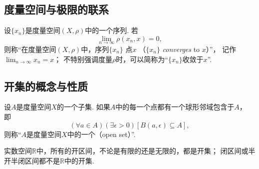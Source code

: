 \subsection{度量空间与极限的联系}
\begin{definition}
设\(\{x_n\}\)是度量空间\((X,\rho)\)中的一个序列.
若\begin{equation*}
	\lim_{n\to\infty} \rho(x_n,x) = 0,
\end{equation*}
则称“在度量空间\((X,\rho)\)中，序列\(\{x_n\}\)  点\(x\)%
（\(\{x_n\}\) \emph{converges} to \(x\)）”，
记作\(\lim_{n\to\infty} x_n = x\)；
不特别强调度量\(\rho\)时，可以简称为“\(\{x_n\}\)收敛于\(x\)”.
\end{definition}

\subsection{开集的概念与性质}
\begin{definition}\label{definition:度量空间.开集的概念}
设\(A\)是度量空间\(X\)的一个子集.
如果\(A\)中的每一个点都有一个球形邻域包含于\(A\)，
即\begin{equation*}
	(\forall a \in A)
	(\exists\epsilon>0)
	[B(a,\epsilon) \subseteq A],
\end{equation*}
则称“\(A\)是度量空间\(X\)中的一个（open set）”.
\end{definition}

\begin{example}
实数空间\(\mathbb{R}\)中，所有的开区间，不论是有限的还是无限的，都是开集；
闭区间或半开半闭区间都不是\(\mathbb{R}\)中的开集.
\end{example}

